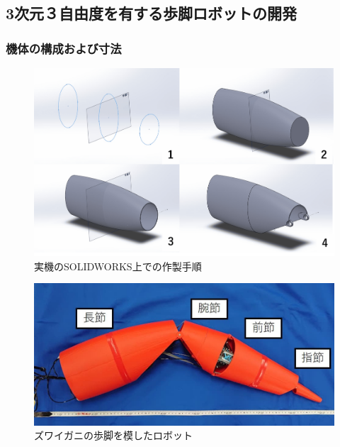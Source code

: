 \subsection{3次元３自由度を有する歩脚ロボットの開発}
\subsubsection{機体の構成および寸法}
\begin{figure}[t]
  \begin{minipage}{1\hsize}
    \centering
    \includegraphics[scale=0.12]{image/kitaimethod.png}
    \caption{実機のSOLIDWORKS上での作製手順}
    \label{fig:solidw}
  \end{minipage}
\end{figure}
%
\begin{figure}[tbp]
  \centering
  \includegraphics[scale=0.29]{image/robot_scale.JPG}
  \caption{ズワイガニの歩脚を模したロボット}
  \label{fig:jikki}
\end{figure}
%
